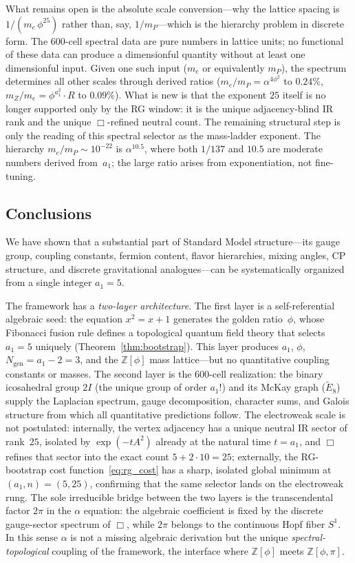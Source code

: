 \documentclass[12pt,a4paper]{article}
\theoremstyle{definition}
\begin{document}
What remains open is the absolute scale conversion---why the lattice spacing is $1/(m_e\,\phi^{25})$ rather than, say, $1/m_P$---which is the hierarchy problem in discrete form.  The 600-cell spectral data are pure numbers in lattice units; no functional of these data can produce a dimensionful quantity without at least one dimensionful input.  Given one such input ($m_e$ or equivalently $m_P$), the spectrum determines all other scales through derived ratios ($m_e/m_P = \alpha^{4\phi^2}$ to $0.24\%$, $m_Z/m_e = \phi^{a_1^2} \cdot R$ to $0.09\%$).  What is new is that the exponent $25$ itself is no longer supported only by the RG window: it is the unique adjacency-blind IR rank and the unique $\Box$-refined neutral count.  The remaining structural step is only the reading of this spectral selector as the mass-ladder exponent.  The hierarchy $m_e/m_P \sim 10^{-22}$ is $\alpha^{10.5}$, where both $1/137$ and $10.5$ are moderate numbers derived from~$a_1$; the large ratio arises from exponentiation, not fine-tuning.

\subsection{Conclusions}

We have shown that a substantial part of Standard Model structure---its gauge group, coupling constants, fermion content, flavor hierarchies, mixing angles, CP structure, and discrete gravitational analogues---can be systematically organized from a single integer $a_1 = 5$.

The framework has a \emph{two-layer architecture}.  The first layer is a self-referential algebraic seed: the equation $x^2 = x + 1$ generates the golden ratio~$\phi$, whose Fibonacci fusion rule defines a topological quantum field theory that selects $a_1 = 5$ uniquely (Theorem~\ref{thm:bootstrap}).  This layer produces $a_1$, $\phi$, $N_{\text{gen}} = a_1 - 2 = 3$, and the $\mathbb{Z}[\phi]$ mass lattice---but no quantitative coupling constants or masses.  The second layer is the 600-cell realization: the binary icosahedral group $2I$ (the unique group of order $a_1!$) and its McKay graph ($\widetilde{E}_8$) supply the Laplacian spectrum, gauge decomposition, character sums, and Galois structure from which all quantitative predictions follow.  The electroweak scale is not postulated: internally, the vertex adjacency has a unique neutral IR sector of rank~$25$, isolated by $\exp(-tA^2)$ already at the natural time $t=a_1$, and $\Box$ refines that sector into the exact count $5 + 2\cdot10 = 25$; externally, the RG-bootstrap cost function~\eqref{eq:rg_cost} has a sharp, isolated global minimum at $(a_1, n) = (5,25)$, confirming that the same selector lands on the electroweak rung.  The sole irreducible bridge between the two layers is the transcendental factor $2\pi$ in the $\alpha$ equation: the algebraic coefficient is fixed by the discrete gauge-sector spectrum of $\Box$, while $2\pi$ belongs to the continuous Hopf fiber $S^1$.  In this sense $\alpha$ is not a missing algebraic derivation but the unique \emph{spectral-topological} coupling of the framework, the interface where $\mathbb{Z}[\phi]$ meets $\mathbb{Z}[\phi,\pi]$.
\end{document}
